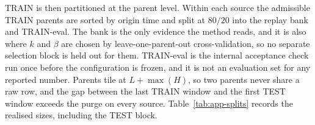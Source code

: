 \documentclass{article}
\begin{document}
TRAIN is then partitioned at the parent level. Within each source the admissible TRAIN parents
are sorted by origin time and split at $80/20$ into the replay bank and TRAIN-eval. The bank is
the only evidence the method reads, and it is also where $k$ and $\beta$ are chosen by
leave-one-parent-out cross-validation, so no separate selection block is held out for them.
TRAIN-eval is the internal acceptance check run once before the configuration is frozen, and
it is not an evaluation set for any reported number. Parents tile at $L + \max(H)$, so two
parents never share a raw row, and the gap between the last TRAIN window and the first TEST
window exceeds the purge on every source.
Table~\ref{tab:app-splits} records the realised sizes, including the TEST block.

\begin{table}[h]
  \caption{Realised split sizes. Counts are of admissible parents and not of correlated mask
  variants, so a parent with several patterns or severities still contributes one unit to
  every statistic in the paper. TEST is the evaluation population for every table in the main
  text, and it is disjoint from all three TRAIN blocks.}
  \label{tab:app-splits}
  \centering
  \small
  \setlength{\tabcolsep}{4pt}
\end{table}
\end{document}
